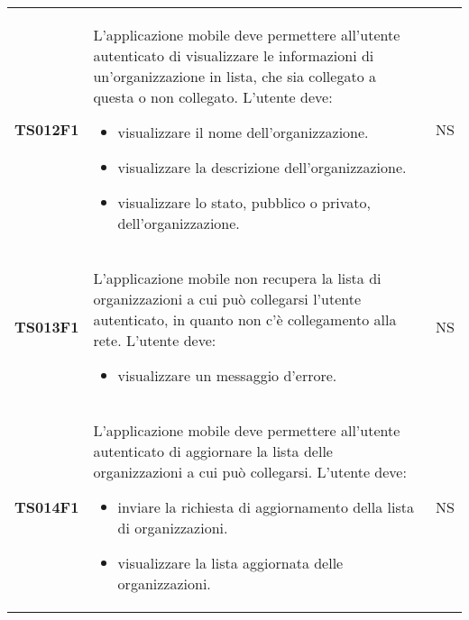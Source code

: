 \documentclass[../piano-di-qualifica.tex]{subfiles}
\begin{document}
\begin{centering}
\begin{longtable}[H]{>{\centering\bfseries}m{3cm} >{}p{10cm} >{\centering\arraybackslash}m{3cm}}
    TS012F1            & L'applicazione mobile deve permettere all'utente autenticato di visualizzare le informazioni di un'organizzazione in lista, che sia collegato a questa o non collegato. \newline
    L'utente deve:
    \begin{itemize}
      \item visualizzare il nome dell'organizzazione.
      \item visualizzare la descrizione dell'organizzazione.
      \item visualizzare lo stato, pubblico o privato, dell'organizzazione.
    \end{itemize}
                       & NS                                                                                                                                                                                                                                                               \\
    TS013F1            & L'applicazione mobile non recupera la lista di organizzazioni a cui può collegarsi l'utente autenticato, in quanto non c'è collegamento alla rete. \newline
    L'utente deve:
    \begin{itemize}
      \item visualizzare un messaggio d'errore.
    \end{itemize}
                       & NS                                                                                                                                                                                                                                                               \\
    TS014F1            & L'applicazione mobile deve permettere all'utente autenticato di aggiornare la lista delle organizzazioni a cui può collegarsi. \newline
    L'utente deve:
    \begin{itemize}
      \item inviare la richiesta di aggiornamento della lista di organizzazioni.
      \item visualizzare la lista aggiornata delle organizzazioni.
    \end{itemize}
                       & NS                                                                                                                                                                                                                                                               \\

\end{longtable}
\end{centering}
\end{document}
